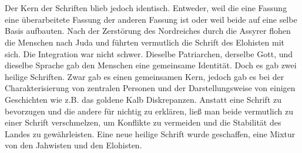 \\~\\
Der Kern der Schriften blieb jedoch identisch. Entweder, weil die eine Fassung eine überarbeitete Fassung der anderen Fassung ist oder weil beide auf eine selbe Basis aufbauten. Nach der Zerstörung des Nordreiches durch die Assyrer flohen die Menschen nach Juda und führten vermutlich die Schrift des Elohisten mit sich. Die Integration war nicht schwer. Dieselbe Patriarchen, derselbe Gott, und dieselbe Sprache gab den Menschen eine gemeinsame Identität. Doch es gab zwei heilige Schriften. Zwar gab es einen gemeinsamen Kern, jedoch gab es bei der Charakterisierung von zentralen Personen und der Darstellungsweise von einigen Geschichten wie z.B. das goldene Kalb Diskrepanzen. Anstatt eine Schrift zu bevorzugen und die andere für nichtig zu erklären, ließ man beide vermutlich zu einer Schrift verschmelzen, um Konflikte zu vermeiden und die Stabilität des Landes zu gewährleisten. Eine neue heilige Schrift wurde geschaffen, eine Mixtur von den Jahwisten und den Elohisten.

